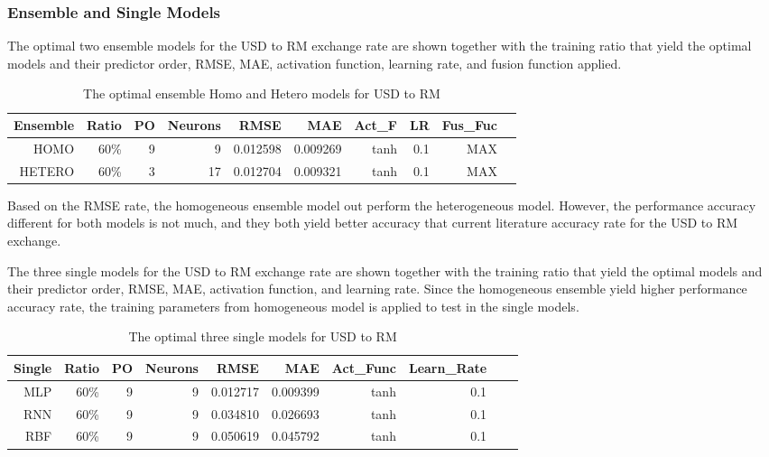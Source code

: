 {{{{{{{{\subsubsection{Ensemble and Single Models}

The optimal two ensemble models for the USD to RM exchange rate are shown together with the training ratio that yield the optimal models and their predictor order, RMSE, MAE, activation function, learning rate, and fusion function applied.
 
\begin{table}[ht]
	\centering
	\begin{tabular}{@{}rrrrrrrrrr@{}}
		\toprule
		\textbf{Ensemble} &\textbf{Ratio}&\textbf{PO}&\textbf{Neurons}& \textbf{RMSE} & \textbf{MAE} & \textbf{Act\_F} & \textbf{LR} &\textbf{ Fus\_Fuc}\\ 
		\midrule
		
		HOMO	& 60\% & 9 & 9 & 0.012598 & 0.009269 & tanh & 0.1 & MAX \\ 	
		HETERO	& 60\% & 3 & 17 & 0.012704 & 0.009321 & tanh & 0.1 & MAX \\
		
		\hline
	\end{tabular}
	\hspace*{1cm}
	\caption{The optimal ensemble  Homo and Hetero models for USD to RM }
	\end{table}
	
Based on the RMSE rate, the homogeneous ensemble model out perform the heterogeneous model. However, the performance accuracy different for both models is not much, and they both yield better accuracy that current literature accuracy rate for the USD to RM exchange.

The three  single models for the USD to RM exchange rate are shown together with the training ratio that yield the optimal models and their predictor order, RMSE, MAE, activation function, and learning rate. Since the homogeneous ensemble yield higher performance accuracy rate, the training parameters from homogeneous model is applied to test in the single models.

\begin{table}[ht]
	\centering
	\begin{tabular}{@{}rrrrrrrrrr@{}}
		\toprule
		\textbf{Single} &\textbf{Ratio}&\textbf{PO}&\textbf{Neurons}& \textbf{RMSE} & \textbf{MAE} & \textbf{Act\_Func} & \textbf{Learn\_Rate} \\ 
		\midrule
		MLP	& 60\% & 9 & 9 & 0.012717 &  0.009399 & tanh & 0.1 \\	
		RNN	& 60\% & 9 & 9 & 0.034810 &  0.026693 & tanh & 0.1 \\
		RBF	& 60\% & 9 & 9 & 0.050619 & 0.045792 & tanh & 0.1  \\
		\hline
	\end{tabular}
	\hspace*{1cm}
	\caption{The optimal three single models for USD to RM }
\end{table}

}}}}}}}}
